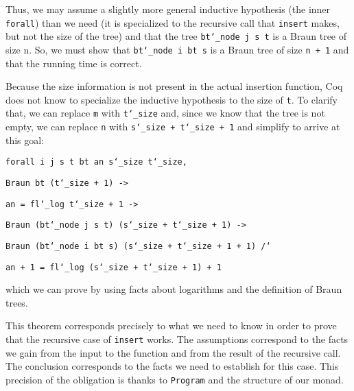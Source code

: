 \documentclass{llncs}
\newcommand{\Scribtexttt}[1]{{\texttt{#1}}}
\newcommand{\Stttextmore}{{\fontencoding{T1}\selectfont>}}
\newenvironment{SingleColumn}{\begin{list}{}{\topsep=0pt\partopsep=0pt%
\listparindent=0pt\itemindent=0pt\labelwidth=0pt\leftmargin=0pt\rightmargin=0pt%
\itemsep=0pt\parsep=0pt}\item}{\end{list}}
\newenvironment{InlineCode}{\begin{trivlist}\item\footnotesize}{\end{trivlist}}
\begin{document}
\noindent Thus, we may assume a slightly more general
inductive hypothesis (the inner \Scribtexttt{forall}) than we need
(it is specialized to the recursive call that \Scribtexttt{insert} makes, but
not the size of the tree) and that the tree \Scribtexttt{bt{\char`\_}node j s t} is a
Braun tree of size n. So, we must show that \Scribtexttt{bt{\char`\_}node i bt s} is a
Braun tree of size \Scribtexttt{n + 1} and that the running time is correct.

Because the size information is not present in the actual insertion
function, Coq does not know to specialize the inductive hypothesis to
the size of \Scribtexttt{t}. To clarify that, we can replace \Scribtexttt{m} with
\Scribtexttt{t{\char`\_}size} and, since we know that the tree is not empty, we can replace
\Scribtexttt{n} with \Scribtexttt{s{\char`\_}size + t{\char`\_}size + 1} and simplify to arrive at this goal:


\noindent \begin{InlineCode}\begin{SingleColumn}\Scribtexttt{forall i j s t bt an s{\char`\_}size t{\char`\_}size,}

\Scribtexttt{}\mbox{\hphantom{\Scribtexttt{x}}}\Scribtexttt{Braun bt (t{\char`\_}size + 1) {-}{\Stttextmore}}

\Scribtexttt{}\mbox{\hphantom{\Scribtexttt{x}}}\Scribtexttt{an = fl{\char`\_}log t{\char`\_}size + 1 {-}{\Stttextmore}}

\Scribtexttt{}\mbox{\hphantom{\Scribtexttt{x}}}\Scribtexttt{Braun (bt{\char`\_}node j s t) (s{\char`\_}size + t{\char`\_}size + 1) {-}{\Stttextmore}}

\Scribtexttt{}\mbox{\hphantom{\Scribtexttt{x}}}\Scribtexttt{Braun (bt{\char`\_}node i bt s) (s{\char`\_}size + t{\char`\_}size + 1 + 1) /{\char`\\}}

\Scribtexttt{}\mbox{\hphantom{\Scribtexttt{x}}}\Scribtexttt{an + 1 = fl{\char`\_}log (s{\char`\_}size + t{\char`\_}size + 1) + 1}\end{SingleColumn}\end{InlineCode}

\noindent which we can prove by using facts about logarithms
and the definition of Braun trees.

This theorem corresponds precisely to what we need to know in order to
prove that the recursive case of \Scribtexttt{insert} works. The assumptions
correspond to the facts we gain from the input to the function and
from the result of the recursive call. The conclusion corresponds to
the facts we need to establish for this case. This precision of the
obligation is thanks to \Scribtexttt{Program} and the structure of our monad.
\end{document}
